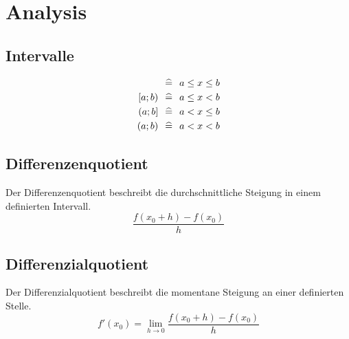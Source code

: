 \documentclass[a4paper, 15pt]{article}
\begin{document}
\section{Analysis}
\subsection{Intervalle}
\begin{align*}
[a;b]\hspace{.25cm}\widehat{=}\hspace{.25cm} a \leq x \leq b \\
[a;b)\hspace{.25cm}\widehat{=}\hspace{.25cm} a \leq x < b \\
(a;b]\hspace{.25cm}\widehat{=}\hspace{.25cm} a < x \leq b \\
(a;b)\hspace{.25cm}\widehat{=}\hspace{.25cm} a < x < b
\end{align*}
\begin{minipage}{.45\textwidth}
\subsection{Differenzenquotient}
Der Differenzenquotient beschreibt die durchschnittliche Steigung in einem definierten Intervall.
\begin{equation*}
\dfrac{f(x_0+h)-f(x_0)}{h}
\end{equation*}
\end{minipage}
\hspace{1cm}
\begin{minipage}{.45\textwidth}
\subsection{Differenzialquotient}
Der Differenzialquotient beschreibt die momentane Steigung an einer definierten Stelle.
\begin{equation*}
f'(x_0) = \lim\limits_{h \rightarrow 0}{\dfrac{f(x_0+h)-f(x_0)}{h}}
\end{equation*}
\end{minipage}
\vspace{.5cm}\newline
\end{document}
